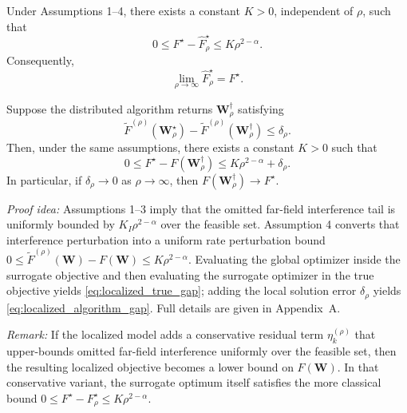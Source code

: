 \begin{theorem}
Under Assumptions 1--4, there exists a constant $K > 0$, independent of $\rho$, such that
\begin{equation}
0 \le F^{\star} - \widehat{F}_{\rho}^{\star} \le K \rho^{2-\alpha}.
\label{eq:localized_true_gap}
\end{equation}
Consequently,
\begin{equation}
\lim_{\rho \rightarrow \infty} \widehat{F}_{\rho}^{\star} = F^{\star}.
\end{equation}
\end{theorem}

\begin{theorem}
Suppose the distributed algorithm returns $\mathbf{W}_{\rho}^{\dagger}$ satisfying
\begin{equation}
\widetilde{F}^{(\rho)}(\mathbf{W}_{\rho}^{\star}) -
\widetilde{F}^{(\rho)}(\mathbf{W}_{\rho}^{\dagger}) \le \delta_{\rho}.
\end{equation}
Then, under the same assumptions, there exists a constant $K > 0$ such that
\begin{equation}
0 \le F^{\star} - F(\mathbf{W}_{\rho}^{\dagger}) \le K \rho^{2-\alpha} + \delta_{\rho}.
\label{eq:localized_algorithm_gap}
\end{equation}
In particular, if $\delta_{\rho} \to 0$ as $\rho \to \infty$, then $F(\mathbf{W}_{\rho}^{\dagger}) \to F^{\star}$.
\end{theorem}

\emph{Proof idea:}
Assumptions 1--3 imply that the omitted far-field interference tail is uniformly bounded by $K_I \rho^{2-\alpha}$ over the feasible set. Assumption 4 converts that interference perturbation into a uniform rate perturbation bound $0 \le \widetilde{F}^{(\rho)}(\mathbf{W}) - F(\mathbf{W}) \le K \rho^{2-\alpha}$. Evaluating the global optimizer inside the surrogate objective and then evaluating the surrogate optimizer in the true objective yields \eqref{eq:localized_true_gap}; adding the local solution error $\delta_{\rho}$ yields \eqref{eq:localized_algorithm_gap}. Full details are given in Appendix~A.

\emph{Remark:}
If the localized model adds a conservative residual term $\eta_k^{(\rho)}$ that upper-bounds omitted far-field interference uniformly over the feasible set, then the resulting localized objective becomes a lower bound on $F(\mathbf{W})$. In that conservative variant, the surrogate optimum itself satisfies the more classical bound $0 \le F^{\star} - F_{\rho}^{\star} \le K \rho^{2-\alpha}$.
